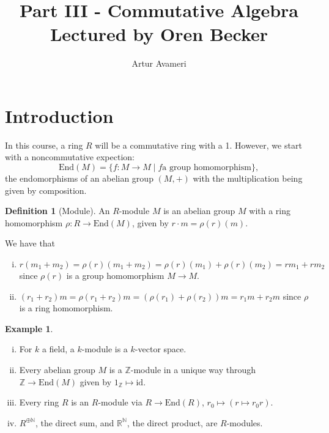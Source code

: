 \documentclass{article}
\title{Part III - Commutative Algebra
    \\ \large
    Lectured by Oren Becker
}
\author{Artur Avameri}
\date{}
\theoremstyle{definition}
\newtheorem{example}{Example}[section]
\newtheorem{defn}{Definition}[section]
\begin{document}
\maketitle
\tableofcontents
\newpage

\section{Introduction}


In this course, a ring $R$ will be a commutative ring with a 1. However, we start with a noncommutative expection: $$\text{End}(M) = \{f: M \to M \mid f \text{a group homomorphism}\},$$ the endomorphisms of an abelian group $(M, +)$ with the multiplication being given by composition.

\begin{defn}[Module]
    An $R$-module $M$ is an abelian group $M$ with a ring homomorphism $\rho : R \to \text{End}(M)$, given by $r \cdot  m =\rho(r)(m)$.
\end{defn}
We have that
\begin{enumerate}[(i)]
    \item $r(m_1 + m_2) = \rho(r)(m_1+m_2) = \rho(r)(m_1) + \rho(r)(m_2) = rm_1 + rm_2$ since $\rho(r)$ is a group homomorphism $M \to M$.
    \item $(r_1 +r_2)m = \rho(r_1+r_2)m = (\rho(r_1)+\rho(r_2))m =r_1m+r_2m$ since $\rho$ is a ring homomorphism.
\end{enumerate}

\begin{example}
    \begin{enumerate}[(i)]
        \item For $k$ a field, a $k$-module is a $k$-vector space.
        \item Every abelian group $M$ is a $\mathbb{Z}$-module in a unique way through $\mathbb{Z} \to \text{End}(M)$ given by $1_{\mathbb{Z}} \mapsto \text{id}$.
        \item Every ring $R$ is an $R$-module via $R \to \text{End}(R)$, $r_0 \mapsto (r \mapsto r_0r)$.
        \item $R^{\oplus \mathbb{N}}$, the direct sum, and $\mathbb{R}^\mathbb{N}$, the direct product, are $R$-modules.
    \end{enumerate}
\end{example}
\end{document}
